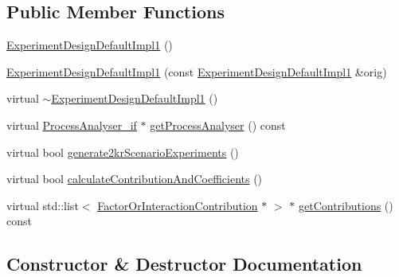 \subsection*{Public Member Functions}
\begin{DoxyCompactItemize}
\item 
\hyperlink{class_experiment_design_default_impl1_a8e0115b5bcc9a779a6d16287acb9d3fb}{Experiment\+Design\+Default\+Impl1} ()
\item 
\hyperlink{class_experiment_design_default_impl1_abeff84ccc13059259dd6b403d735eb92}{Experiment\+Design\+Default\+Impl1} (const \hyperlink{class_experiment_design_default_impl1}{Experiment\+Design\+Default\+Impl1} \&orig)
\item 
virtual \hyperlink{class_experiment_design_default_impl1_ae918701a23c53e6eac940924f00564ed}{$\sim$\+Experiment\+Design\+Default\+Impl1} ()
\item 
virtual \hyperlink{class_process_analyser__if}{Process\+Analyser\+\_\+if} $\ast$ \hyperlink{class_experiment_design_default_impl1_a580d66000da7552e784c6aca6d408ee6}{get\+Process\+Analyser} () const 
\item 
virtual bool \hyperlink{class_experiment_design_default_impl1_a067618c2298167a27b39af7b3aedb59a}{generate2kr\+Scenario\+Experiments} ()
\item 
virtual bool \hyperlink{class_experiment_design_default_impl1_ae9588002790304dd99b37172bcf8165f}{calculate\+Contribution\+And\+Coefficients} ()
\item 
virtual std\+::list$<$ \hyperlink{class_factor_or_interaction_contribution}{Factor\+Or\+Interaction\+Contribution} $\ast$ $>$ $\ast$ \hyperlink{class_experiment_design_default_impl1_ab1f6f58b124ef68c33e16802d668c50b}{get\+Contributions} () const 
\end{DoxyCompactItemize}


\subsection{Constructor \& Destructor Documentation}
